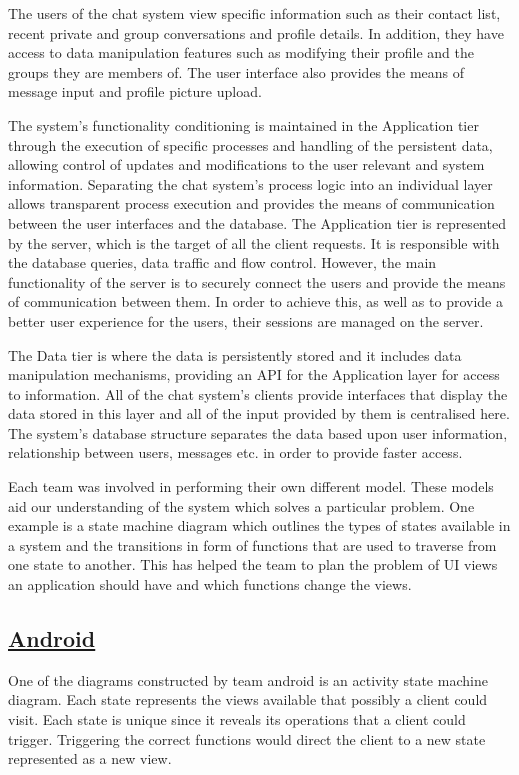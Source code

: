 \documentclass{article}
\begin{document}
	The users of the chat system view specific information such as their contact list, recent private and group conversations and profile details. In addition, they have access to data manipulation features such as modifying their profile and the groups they are members of. The user interface also provides the means of message input and profile picture upload.\par
	
	The system's functionality conditioning is maintained in the Application tier through the execution of specific processes and handling of the persistent data, allowing control of updates and modifications to the user relevant and system information. Separating the chat system's process logic into an individual layer allows transparent process execution and provides the means of communication between the user interfaces and the database. The Application tier is represented by the server, which is the target of all the client requests. It is responsible with the database queries, data traffic and flow control. However, the main functionality of the server is to securely connect the users and provide the means of communication between them. In order to achieve this, as well as to provide a better user experience for the users, their sessions are managed on the server.
	
	The Data tier is where the data is persistently stored and it includes data manipulation mechanisms, providing an API for the Application layer for access to information. All of the chat system's clients provide interfaces that display the data stored in this layer and all of the input provided by them is centralised here. The system's database structure separates the data based upon user information, relationship between users, messages etc. in order to provide faster access.
	
	Each team was involved in performing their own different model. These models aid our understanding of the system which solves a particular problem. One example is a state machine diagram which outlines the types of states available in a system and the transitions in form of functions that are used to traverse from one state to another. This has helped the team to plan the problem of UI views an application should have and which functions change the views. \par
	 
	\newpage
	\subsection{\underline{\textbf{Android}}}
	One of the diagrams constructed by team android is an activity state machine diagram. Each state represents the views available that possibly a client could visit. Each state is unique since it reveals its operations that a client could trigger. Triggering the correct functions would direct the client to a new state represented as a new view.
	
\end{document}
